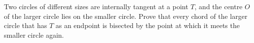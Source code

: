 Two circles of different sizes are internally tangent at a point $T$, and the centre $O$ of the larger circle lies on the smaller circle. Prove that every chord of the larger circle that has $T$ as an endpoint is bisected by the point at which it meets the smaller circle again.
